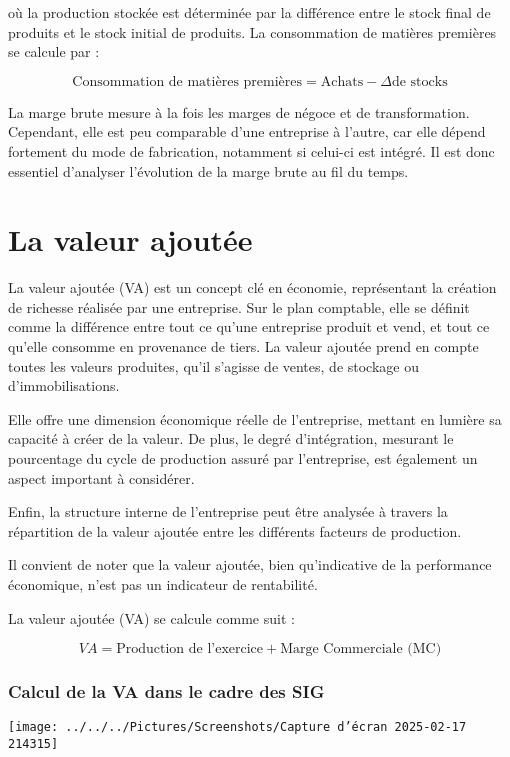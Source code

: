 \documentclass[a4paper, 12pt]{report}
\begin{document}
où la production stockée est déterminée par la différence entre le stock final de produits et le stock initial de produits. La consommation de matières premières se calcule par :

\[ 
\text{Consommation de matières premières} = \text{Achats} - \Delta \text{de stocks} 
\]

La marge brute mesure à la fois les marges de négoce et de transformation. Cependant, elle est peu comparable d'une entreprise à l'autre, car elle dépend fortement du mode de fabrication, notamment si celui-ci est intégré. Il est donc essentiel d'analyser l'évolution de la marge brute au fil du temps.

\section{La valeur ajoutée}

La valeur ajoutée (VA) est un concept clé en économie, représentant la création de richesse réalisée par une entreprise. 
Sur le plan comptable, elle se définit comme la différence entre tout ce qu'une entreprise produit et vend, et tout ce qu'elle consomme en provenance de tiers. La valeur ajoutée prend en compte toutes les valeurs produites, qu'il s'agisse de ventes, de stockage ou d'immobilisations.

Elle offre une dimension économique réelle de l'entreprise, mettant en lumière sa capacité à créer de la valeur. De plus, le degré d'intégration, mesurant le pourcentage du cycle de production assuré par l'entreprise, est également un aspect important à considérer. 

Enfin, la structure interne de l'entreprise peut être analysée à travers la répartition de la valeur ajoutée entre les différents facteurs de production. 

Il convient de noter que la valeur ajoutée, bien qu'indicative de la performance économique, n'est pas un indicateur de rentabilité.

La valeur ajoutée (VA) se calcule comme suit :

\[
VA = \text{Production de l'exercice} + \text{Marge Commerciale (MC)}
\]

\subsubsection{Calcul de la VA dans le cadre des SIG}

\begin{center}
	\texttt{[image: ../../../Pictures/Screenshots/Capture d'écran 2025-02-17 214315]}
\end{center}
\end{document}

